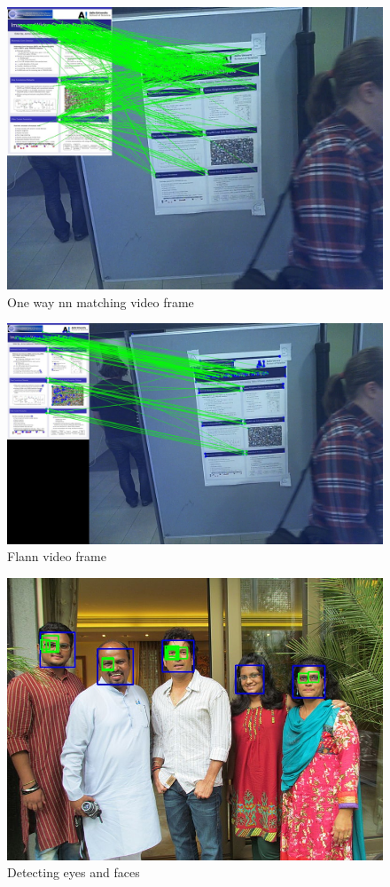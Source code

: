 \documentclass{article}
\begin{document}
\begin{figure}
\center
            \includegraphics[width=1\textwidth]{frameslow}
\caption{One way nn matching video frame}
\end{figure}        
\begin{figure}
\center
            \includegraphics[width=1\textwidth]{flannv}
\caption{Flann video frame}
\end{figure}         
\begin{figure}
\center
            \includegraphics[width=1\textwidth]{pplface}
\caption{Detecting eyes and faces}
\end{figure}      
\end{document}
